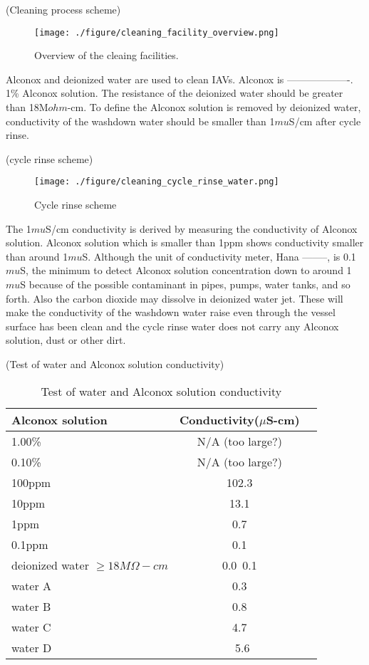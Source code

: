(Cleaning process scheme)
\begin{figure}
    \centering
    \texttt{[image: ./figure/cleaning\_facility\_overview.png]}
    \caption{Overview of the cleaing facilities.}
    \label{cleaning_facility_overview.png}
    \end{figure}

Alconox and deionized water are used to clean IAVs. Alconox is -------------------.
1\% Alconox solution.
The resistance of the deionized water should be greater than 18M$ohm$-cm.
To define the Alconox solution is removed by deionized water, conductivity of the
washdown water should be smaller than 1$mu$S/cm after cycle rinse.


(cycle rinse scheme)
\begin{figure}
    \centering
    \texttt{[image: ./figure/cleaning\_cycle\_rinse\_water.png]}
    \caption{Cycle rinse scheme}
    \label{cleaning_cycle_rinse_water.png}
    \end{figure}

The 1$mu$S/cm conductivity is derived by measuring the conductivity of Alconox solution.
Alconox solution which is smaller than 1ppm shows conductivity smaller than around 1$mu$S.
Although the unit of conductivity meter, Hana --------, is 0.1 $mu$S, the minimum to detect
Alconox solution concentration down to around 1$mu$S because of the possible contaminant
in pipes, pumps, water tanks, and so forth. Also the carbon dioxide may dissolve in
deionized water jet. These will make the conductivity of the washdown water raise
even through the vessel surface has been clean and the cycle rinse water does not
carry any Alconox solution, dust or other dirt.


(Test of water and Alconox solution conductivity)
\begin{table}
\centering
\caption{Test of water and Alconox solution conductivity}
\label{tab:AlconoxConductivity}
\begin{tabular}{lcp{5.0cm}}
Alconox solution &   Conductivity($\mu$S-cm) \\
\hline
\hline
1.00\% &  N/A (too large?)\\
\hline
0.10\% &  N/A (too large?)\\
\hline
100ppm & 102.3\\
\hline
10ppm  & 13.1\\
\hline
1ppm   & 0.7\\
\hline
0.1ppm & 0.1\\
\hline
deionized water $\geq 18M\Omega-cm$ &0.0~0.1\\
\hline
water A &0.3\\
\hline
water B &0.8\\
\hline
water C &4.7\\
\hline
water D &~5.6\\
\hline
\end{tabular}
\end{table}



